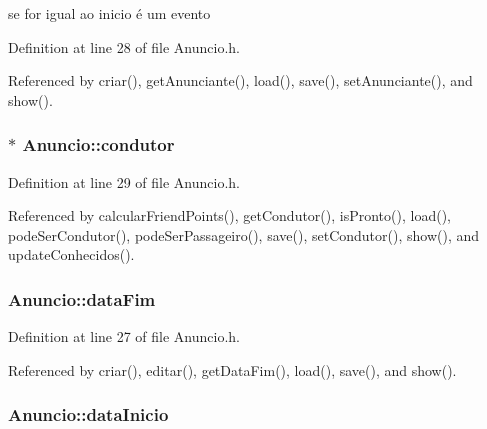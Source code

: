se for igual ao inicio é um evento 



Definition at line 28 of file Anuncio.\+h.



Referenced by criar(), get\+Anunciante(), load(), save(), set\+Anunciante(), and show().

\hypertarget{class_anuncio_a8771818ef0855c6b70e2aca6c89e3177}{
\subsubsection[{condutor}]{$\ast$ Anuncio\+::condutor\hspace{0.3cm}{\ttfamily [protected]}}}\label{class_anuncio_a8771818ef0855c6b70e2aca6c89e3177}


Definition at line 29 of file Anuncio.\+h.



Referenced by calcular\+Friend\+Points(), get\+Condutor(), is\+Pronto(), load(), pode\+Ser\+Condutor(), pode\+Ser\+Passageiro(), save(), set\+Condutor(), show(), and update\+Conhecidos().

\hypertarget{class_anuncio_ac3b9182cc541cb68215f8aa09fb0e11a}{
\subsubsection[{data\+Fim}]{ Anuncio\+::data\+Fim\hspace{0.3cm}{\ttfamily [protected]}}}\label{class_anuncio_ac3b9182cc541cb68215f8aa09fb0e11a}


Definition at line 27 of file Anuncio.\+h.



Referenced by criar(), editar(), get\+Data\+Fim(), load(), save(), and show().

\hypertarget{class_anuncio_abeb7d8c5fe5e7d127005044981a3cd3d}{
\subsubsection[{data\+Inicio}]{ Anuncio\+::data\+Inicio\hspace{0.3cm}{\ttfamily [protected]}}}\label{class_anuncio_abeb7d8c5fe5e7d127005044981a3cd3d}


